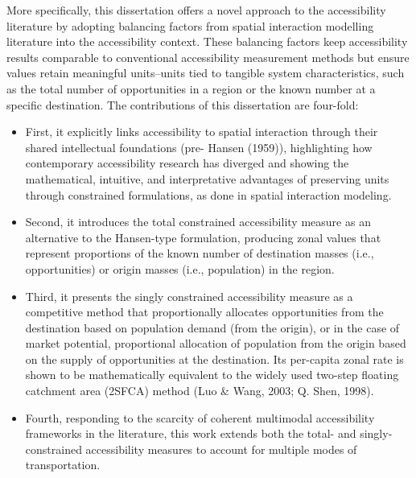 \documentclass[
11pt, %
oneside, %
english, %
singlespacing, %
]{macthesis} %
\def\tightlist{}
\begin{document}
More specifically, this dissertation offers a novel approach to the accessibility literature by adopting balancing factors from spatial interaction modelling literature into the accessibility context. These balancing factors keep accessibility results comparable to conventional accessibility measurement methods but ensure values retain meaningful units--units tied to tangible system characteristics, such as the total number of opportunities in a region or the known number at a specific destination. The contributions of this dissertation are four-fold:

\begin{itemize}
\tightlist
\item
  First, it explicitly links accessibility to spatial interaction through their shared intellectual foundations (pre- Hansen (1959)), highlighting how contemporary accessibility research has diverged and showing the mathematical, intuitive, and interpretative advantages of preserving units through constrained formulations, as done in spatial interaction modeling.
\item
  Second, it introduces the total constrained accessibility measure as an alternative to the Hansen-type formulation, producing zonal values that represent proportions of the known number of destination masses (i.e., opportunities) or origin masses (i.e., population) in the region.
\item
  Third, it presents the singly constrained accessibility measure as a competitive method that proportionally allocates opportunities from the destination based on population demand (from the origin), or in the case of market potential, proportional allocation of population from the origin based on the supply of opportunities at the destination. Its per-capita zonal rate is shown to be mathematically equivalent to the widely used two-step floating catchment area (2SFCA) method (Luo \& Wang, 2003; Q. Shen, 1998).
\item
  Fourth, responding to the scarcity of coherent multimodal accessibility frameworks in the literature, this work extends both the total- and singly-constrained accessibility measures to account for multiple modes of transportation.
\end{itemize}
\end{document}
